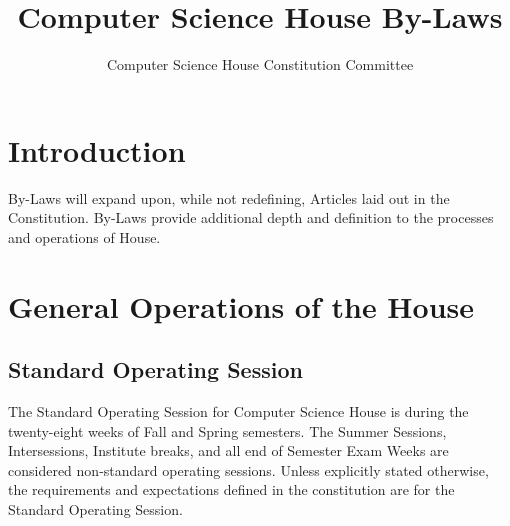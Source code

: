 \documentclass{article}
\title{Computer Science House By-Laws}
\author{Computer Science House Constitution Committee}
\date{\datechanged}
\newcommand{\bylaw}[1]{\section{#1} \label{#1}}
\newcommand{\bsection}[1]{\subsection{#1} \label{#1}}
\begin{document}
\maketitle

\tableofcontents

\bylaw{Introduction}
By-Laws will expand upon, while not redefining, Articles laid out in the Constitution.
By-Laws provide additional depth and definition to the processes and operations of House.

\bylaw{General Operations of the House}
\bsection{Standard Operating Session}
The Standard Operating Session for Computer Science House is during the twenty-eight weeks of Fall and Spring semesters.
The Summer Sessions, Intersessions, Institute breaks, and all end of Semester Exam Weeks are considered non-standard operating sessions.
Unless explicitly stated otherwise, the requirements and expectations defined in the constitution are for the Standard Operating Session.
\end{document}
